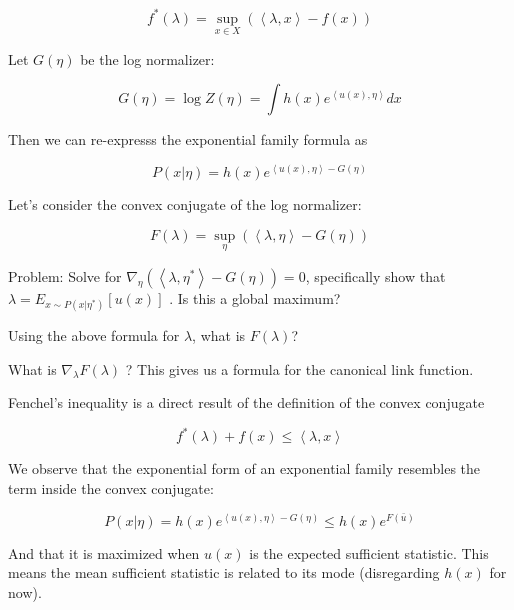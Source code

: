 \documentclass[a4paper]{article}
\begin{document}
\begin{equation}
  f^*( \lambda ) = \sup_{x \in X} \left( \left< \lambda, x \right> - f(x) \right)
  \label{convex conjugate}
\end{equation}

Let $G(\eta)$ be the log normalizer:

\begin{equation}
  G(\eta) = \log Z(\eta) = \int h(x) e^{ \left< u(x), \eta \right> } dx
  \label{}
\end{equation}

Then we can re-expresss the exponential family formula as

\begin{equation}
  P( x \vert \eta) = h(x) e^{ \left< u(x), \eta \right> - G(\eta) }
  \label{}
\end{equation}

Let's consider the convex conjugate of the log normalizer:

\begin{equation}
  F( \lambda ) = \sup_\eta \left( \left< \lambda, \eta \right> - G(\eta) \right)
  \label{}
\end{equation}

Problem:  
Solve for $ \nabla_\eta \left( \left< \lambda, \eta^* \right> - G(\eta) \right) = 0 $, specifically show that $ \lambda = E_{ x \sim P( x \vert \eta^*) } \left[ u(x) \right] $ .  Is this a global maximum?  

Using the above formula for $\lambda$, what is $F(\lambda)$?  

What is $\nabla_\lambda F(\lambda)$ ?  This gives us a formula for the canonical link function.

Fenchel's inequality is a direct result of the definition of the convex conjugate

\begin{equation}
  f^*( \lambda) + f(x) \leq \left< \lambda, x \right>
  \label{Fenchel's inequality}
\end{equation}

We observe that the exponential form of an exponential family resembles the term inside the convex conjugate:

\begin{equation}
  P( x \vert \eta) = h(x) e^{ \left< u(x), \eta \right> - G(\eta) } \leq h(x) e^{ F( \bar{u} ) }
  \label{}
\end{equation}

And that it is maximized when $u(x)$ is the expected sufficient statistic.  This means the mean sufficient statistic is related to its mode (disregarding $h(x)$ for now).  
\end{document}
